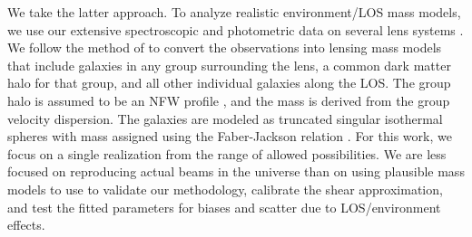 We take the latter approach. To analyze realistic environment/LOS mass models, we use our extensive spectroscopic and photometric data on several lens systems \citep{Wong11}. We follow the method of \citet{Wong11} to convert the observations into lensing mass models that include galaxies in any group surrounding the lens, a common dark matter halo for that group, and all other individual galaxies along the LOS. The group halo is assumed to be an NFW profile \citep{Navarro96}, and the mass is derived from the group velocity dispersion. The galaxies are modeled as truncated singular isothermal spheres with mass assigned using the Faber-Jackson relation \citep{Faber76}. For this work, we focus on a single realization from the range of allowed possibilities.  We are less focused on reproducing actual beams in the universe than on using plausible mass models to use to validate our methodology, calibrate the shear approximation, and test the fitted parameters for biases and scatter due to LOS/environment effects.